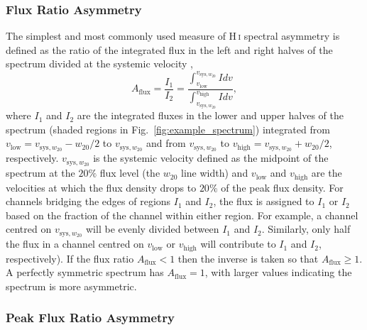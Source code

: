 \documentclass[fleqn,usenatbib]{mnras}
\begin{document}
\subsubsection{Flux Ratio Asymmetry}
\label{ss-sec:flux_asym}

The simplest and most commonly used measure of H\,\textsc{i} spectral asymmetry is defined as the ratio of the integrated flux in the left and right halves of the spectrum divided at the systemic velocity \citep[e.g.][]{Richter1994,Haynes1998,Espada2011,Scott2018},
\begin{equation}
	\displaystyle A_{\mathrm{flux}}=\frac{I_1}{I_2}=\frac{\int_{v_{\mathrm{low}}}^{v_{\mathrm{sys},w_{20}}} Idv}{\int_{v_{\mathrm{sys},w_{20}}}^{v_{\mathrm{high}}} Idv},
	\label{equ:flux_asym}
\end{equation}
where $I_{1}$ and $I_{2}$ are the integrated fluxes in the lower and upper halves of the spectrum (shaded regions in Fig.~\ref{fig:example_spectrum}) integrated from $v_{\mathrm{low}}=v_{\mathrm{sys},w_{20}}-w_{20}/2$ to $v_{\mathrm{sys},w_{20}}$ and from $v_{\mathrm{sys},w_{20}}$ to $v_{\mathrm{high}}=v_{\mathrm{sys},w_{20}}+w_{20}/2$, respectively. $v_{\mathrm{sys},w_{20}}$ is the systemic velocity defined as the midpoint of the spectrum at the $20\%$ flux level (the $w_{20}$ line width) and $v_{\mathrm{low}}$ and $v_{\mathrm{high}}$ are the velocities at which the flux density drops to $20\%$ of the peak flux density. For channels bridging the edges of regions $I_{1}$ and $I_{2}$, the flux is assigned to $I_{1}$ or $I_{2}$ based on the fraction of the channel within either region. For example, a channel centred on $v_{\mathrm{sys},w_{20}}$ will be evenly divided between $I_{1}$ and $I_{2}$. Similarly, only half the flux in a channel centred on $v_{\mathrm{low}}$ or $v_{\mathrm{high}}$ will contribute to $I_{1}$ and $I_{2}$, respectively). If the flux ratio $A_{\mathrm{flux}}<1$ then the inverse is taken so that $A_{\mathrm{flux}}\geq1$. A perfectly symmetric spectrum has $A_{\mathrm{flux}}=1$, with larger values indicating the spectrum is more asymmetric. 

\subsubsection{Peak Flux Ratio Asymmetry}
\label{ss-sec:peak_asym}
\end{document}
